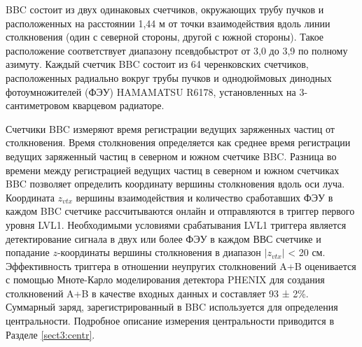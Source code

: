BBC состоит из двух одинаковых счетчиков, окружающих трубу пучков и расположенных на расстоянии 1,44 м от точки взаимодействия вдоль линии столкновения (один с северной стороны, другой с южной стороны). Такое расположение соответствует диапазону псевдобыстрот от 3,0 до 3,9 по полному азимуту. Каждый счетчик BBC состоит из 64 черенковских счетчиков, расположенных радиально вокруг трубы пучков и однодюймовых динодных фотоумножителей (ФЭУ) HAMAMATSU R6178, установленных на 3-сантиметровом кварцевом радиаторе.

Счетчики BBC измеряют время регистрации ведущих заряженных частиц от столкновения. Время столкновения определяется как среднее время регистрации ведущих заряженный частиц в северном и южном счетчике BBC. 
Разница во времени между регистрацией ведущих частиц в северном и южном счетчиках BBC позволяет определить координату вершины столкновения вдоль оси луча. Координата $z_{vtx}$ вершины взаимодействия и количество сработавших ФЭУ в каждом BBC счетчике рассчитываются онлайн и отправляются в триггер первого уровня LVL1. Необходимыми условиями срабатывания LVL1 триггера является детектирование сигнала в двух или более ФЭУ в каждом ВВС счетчике и попадание $z$-координаты вершины столкновения в диапазон $|z_{vtx}|$ < 20 см.  Эффективность триггера в отношении неупругих столкновений A+B оценивается с помощью Мноте-Карло моделирования детектора PHENIX для создания столкновений A+B в качестве входных данных и составляет 93 ± 2\%. Суммарный заряд, зарегистрированный в BBC используется для определения центральности. Подробное описание измерения центральности приводится в Разделе \ref{sect3:centr}.

